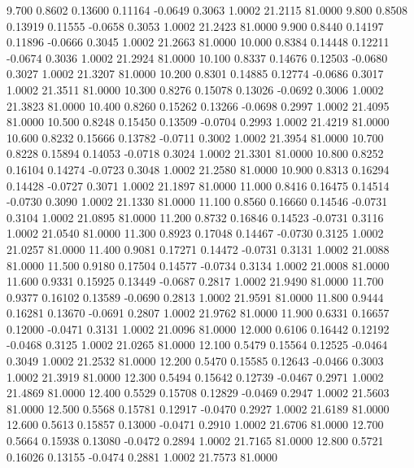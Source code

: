    9.700   0.8602   0.13600   0.11164  -0.0649   0.3063   1.0002  21.2115  81.0000
   9.800   0.8508   0.13919   0.11555  -0.0658   0.3053   1.0002  21.2423  81.0000
   9.900   0.8440   0.14197   0.11896  -0.0666   0.3045   1.0002  21.2663  81.0000
  10.000   0.8384   0.14448   0.12211  -0.0674   0.3036   1.0002  21.2924  81.0000
  10.100   0.8337   0.14676   0.12503  -0.0680   0.3027   1.0002  21.3207  81.0000
  10.200   0.8301   0.14885   0.12774  -0.0686   0.3017   1.0002  21.3511  81.0000
  10.300   0.8276   0.15078   0.13026  -0.0692   0.3006   1.0002  21.3823  81.0000
  10.400   0.8260   0.15262   0.13266  -0.0698   0.2997   1.0002  21.4095  81.0000
  10.500   0.8248   0.15450   0.13509  -0.0704   0.2993   1.0002  21.4219  81.0000
  10.600   0.8232   0.15666   0.13782  -0.0711   0.3002   1.0002  21.3954  81.0000
  10.700   0.8228   0.15894   0.14053  -0.0718   0.3024   1.0002  21.3301  81.0000
  10.800   0.8252   0.16104   0.14274  -0.0723   0.3048   1.0002  21.2580  81.0000
  10.900   0.8313   0.16294   0.14428  -0.0727   0.3071   1.0002  21.1897  81.0000
  11.000   0.8416   0.16475   0.14514  -0.0730   0.3090   1.0002  21.1330  81.0000
  11.100   0.8560   0.16660   0.14546  -0.0731   0.3104   1.0002  21.0895  81.0000
  11.200   0.8732   0.16846   0.14523  -0.0731   0.3116   1.0002  21.0540  81.0000
  11.300   0.8923   0.17048   0.14467  -0.0730   0.3125   1.0002  21.0257  81.0000
  11.400   0.9081   0.17271   0.14472  -0.0731   0.3131   1.0002  21.0088  81.0000
  11.500   0.9180   0.17504   0.14577  -0.0734   0.3134   1.0002  21.0008  81.0000
  11.600   0.9331   0.15925   0.13449  -0.0687   0.2817   1.0002  21.9490  81.0000
  11.700   0.9377   0.16102   0.13589  -0.0690   0.2813   1.0002  21.9591  81.0000
  11.800   0.9444   0.16281   0.13670  -0.0691   0.2807   1.0002  21.9762  81.0000
  11.900   0.6331   0.16657   0.12000  -0.0471   0.3131   1.0002  21.0096  81.0000
  12.000   0.6106   0.16442   0.12192  -0.0468   0.3125   1.0002  21.0265  81.0000
  12.100   0.5479   0.15564   0.12525  -0.0464   0.3049   1.0002  21.2532  81.0000
  12.200   0.5470   0.15585   0.12643  -0.0466   0.3003   1.0002  21.3919  81.0000
  12.300   0.5494   0.15642   0.12739  -0.0467   0.2971   1.0002  21.4869  81.0000
  12.400   0.5529   0.15708   0.12829  -0.0469   0.2947   1.0002  21.5603  81.0000
  12.500   0.5568   0.15781   0.12917  -0.0470   0.2927   1.0002  21.6189  81.0000
  12.600   0.5613   0.15857   0.13000  -0.0471   0.2910   1.0002  21.6706  81.0000
  12.700   0.5664   0.15938   0.13080  -0.0472   0.2894   1.0002  21.7165  81.0000
  12.800   0.5721   0.16026   0.13155  -0.0474   0.2881   1.0002  21.7573  81.0000
